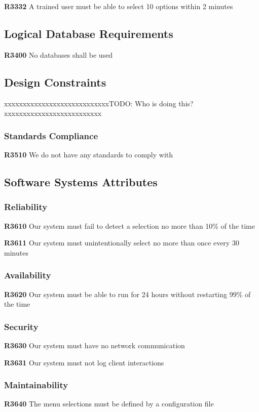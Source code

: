 \documentclass{article}
\begin{document}
\textbf{R3332} A trained user must be able to select 10 options within 2 minutes
\setlength\parindent{0pt}

\subsection{Logical Database Requirements}
\textbf{R3400} No databases shall be used


\subsection{Design Constraints}
{\color{red}xxxxxxxxxxxxxxxxxxxxxxxxxxxxTODO: Who is doing this?xxxxxxxxxxxxxxxxxxxxxxxxxx}

\subsubsection{Standards Compliance}
\textbf{R3510} We do not have any standards to comply with

\subsection{Software Systems Attributes}

\subsubsection{Reliability} 
\textbf{R3610} Our system must fail to detect a selection no more than 10\% of the time

\textbf{R3611} Our system must unintentionally select no more than once every 30 minutes

\subsubsection{Availability}
\textbf{R3620} Our system must be able to run for 24 hours without restarting 99\% of the time

\subsubsection{Security}
\textbf{R3630} Our system must have no network communication

\textbf{R3631} Our system must not log client interactions

\subsubsection{Maintainability}
\textbf{R3640} The menu selections must be defined by a configuration file
\end{document}
